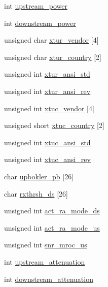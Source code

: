 \begin{DoxyCompactItemize}
\item 
int \hyperlink{structdsl__fapi__line__obj_a2bea256ab435b5989d286358c95ca2af}{upstream\-\_\-power}
\item 
int \hyperlink{structdsl__fapi__line__obj_a0d774a195b98a307a8d847d6ffe1860f}{downstream\-\_\-power}
\item 
unsigned char \hyperlink{structdsl__fapi__line__obj_a84427f6c66bdf205931732cee9c63bb1}{xtur\-\_\-vendor} \mbox{[}4\mbox{]}
\item 
unsigned char \hyperlink{structdsl__fapi__line__obj_a54e206c0e002258adc6f36b24f5603ef}{xtur\-\_\-country} \mbox{[}2\mbox{]}
\item 
unsigned int \hyperlink{structdsl__fapi__line__obj_af1e0f2fc8496273a912920ee28c6c2f0}{xtur\-\_\-ansi\-\_\-std}
\item 
unsigned int \hyperlink{structdsl__fapi__line__obj_a032c67a14b74d170a3bec92612000df2}{xtur\-\_\-ansi\-\_\-rev}
\item 
unsigned int \hyperlink{structdsl__fapi__line__obj_afe00cbdc588c0de8572cd43779cd1961}{xtuc\-\_\-vendor} \mbox{[}4\mbox{]}
\item 
unsigned short \hyperlink{structdsl__fapi__line__obj_a8dae64b04014ddddf8cc044844eba5ec}{xtuc\-\_\-country} \mbox{[}2\mbox{]}
\item 
unsigned int \hyperlink{structdsl__fapi__line__obj_a4a559c7aaa78e041ad41fdd131348baf}{xtuc\-\_\-ansi\-\_\-std}
\item 
unsigned int \hyperlink{structdsl__fapi__line__obj_a177b8d1be46871b866c0728df3f74545}{xtuc\-\_\-ansi\-\_\-rev}
\item 
char \hyperlink{structdsl__fapi__line__obj_ae81094c7b07809194b99fac381bb297e}{upbokler\-\_\-pb} \mbox{[}26\mbox{]}
\item 
char \hyperlink{structdsl__fapi__line__obj_a690fe932966a61e91cf60cc3142ffbbc}{rxthrsh\-\_\-ds} \mbox{[}26\mbox{]}
\item 
unsigned int \hyperlink{structdsl__fapi__line__obj_a7d571cdd52039fe9bc2e7399548dc7b0}{act\-\_\-ra\-\_\-mode\-\_\-ds}
\item 
unsigned int \hyperlink{structdsl__fapi__line__obj_a56f462732df95fbff30dcd2664d2a599}{act\-\_\-ra\-\_\-mode\-\_\-us}
\item 
unsigned int \hyperlink{structdsl__fapi__line__obj_a5f17749bee44180af66d7b9d25795d34}{snr\-\_\-mroc\-\_\-us}
\item 
int \hyperlink{structdsl__fapi__line__obj_af0ca7939507cc4cd14d361b2fabc6700}{upstream\-\_\-attenuation}
\item 
int \hyperlink{structdsl__fapi__line__obj_a16af7c5196fe68ba1d39bcc6108a48d7}{downstream\-\_\-attenuation}
\end{DoxyCompactItemize}


